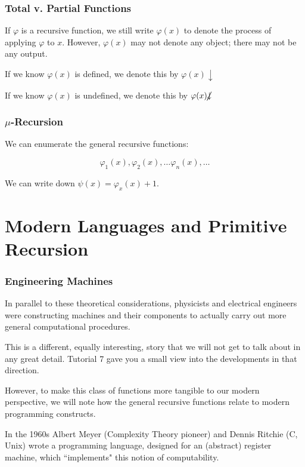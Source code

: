 \documentclass{beamer}
\begin{document}
\begin{frame}
	\frametitle{Total v. Partial Functions}

	If $\varphi$ is a recursive function, we still write $\varphi(x)$ to denote the process of applying $\varphi$ to $x$. However, $\varphi(x)$ may not denote any object; there may not be any output.  

	\vspace{0.5cm}

	If we know $\varphi(x)$ is defined, we denote this by $\varphi(x)\downarrow$
	
	\vspace{0.5cm}

	If we know $\varphi(x)$ is undefined, we denote this by $\varphi(x)\cancel{\downarrow}$
\end{frame}

\begin{frame}
	\frametitle{$\mu$-Recursion}

	We can enumerate the general recursive functions:
	
	$$\varphi_{1}(x), \varphi_{2}(x), \dots \varphi_{n}(x), \dots $$ 
		
	We can write down $\psi(x) = \varphi_{x}(x) + 1$. 

	\vspace{5cm}

\end{frame}

\section{Modern Languages and Primitive Recursion}

\begin{frame}
	\frametitle{Engineering Machines}

	In parallel to these theoretical considerations, physicists and electrical engineers were constructing machines and their components to actually carry out more general computational procedures.  

	\vspace{0.5cm} 

	This is a different, equally interesting, story that we will not get to talk about in any great detail. Tutorial 7 gave you a small view into the developments in that direction. 

	\vspace{0.5cm}

	However, to make this class of functions more tangible to our modern perspective, we will note how the general recursive functions relate to modern programming constructs. 

	\vspace{0.5cm}

	In the 1960s Albert Meyer (Complexity Theory pioneer) and Dennis Ritchie (C, Unix) wrote a programming language, designed for an (abstract) register machine, which ``implements" this notion of computability.

\end{frame}
\end{document}
